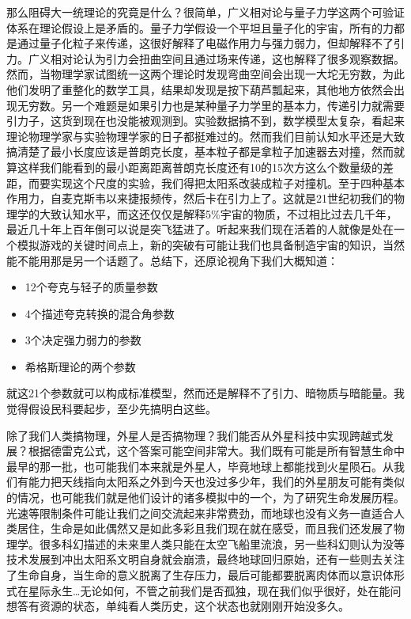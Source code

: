 \documentclass[]{book}
\providecommand{\tightlist}{%
  \setlength{\itemsep}{0pt}\setlength{\parskip}{0pt}}
\begin{document}
那么阻碍大一统理论的究竟是什么？很简单，广义相对论与量子力学这两个可验证体系在理论假设上是矛盾的。量子力学假设一个平坦且量子化的宇宙，所有的力都是通过量子化粒子来传递，这很好解释了电磁作用力与强力弱力，但却解释不了引力。广义相对论认为引力会扭曲空间且通过场来传递，这也解释了很多观察数据。然而，当物理学家试图统一这两个理论时发现弯曲空间会出现一大坨无穷数，为此他们发明了重整化的数学工具，结果却发现是按下葫芦瓢起来，其他地方依然会出现无穷数。另一个难题是如果引力也是某种量子力学里的基本力，传递引力就需要引力子，这货到现在也没能被观测到。实验数据搞不到，数学模型太复杂，看起来理论物理学家与实验物理学家的日子都挺难过的。然而我们目前认知水平还是大致搞清楚了最小长度应该是普朗克长度，基本粒子都是拿粒子加速器去对撞，然而就算这样我们能看到的最小距离距离普朗克长度还有10的15次方这么个数量级的差距，而要实现这个尺度的实验，我们得把太阳系改装成粒子对撞机。至于四种基本作用力，自麦克斯韦以来捷报频传，然后卡在引力上了。这就是21世纪初我们的物理学的大致认知水平，而这还仅仅是解释5\%宇宙的物质，不过相比过去几千年，最近几十年上百年倒可以说是突飞猛进了。听起来我们现在活着的人就像是处在一个模拟游戏的关键时间点上，新的突破有可能让我们也具备制造宇宙的知识，当然能不能用那是另一个话题了。总结下，还原论视角下我们大概知道：

\begin{itemize}
\tightlist
\item
  12个夸克与轻子的质量参数
\item
  4个描述夸克转换的混合角参数
\item
  3个决定强力弱力的参数
\item
  希格斯理论的两个参数
\end{itemize}

就这21个参数就可以构成标准模型，然而还是解释不了引力、暗物质与暗能量。我觉得假设民科要起步，至少先搞明白这些。

除了我们人类搞物理，外星人是否搞物理？我们能否从外星科技中实现跨越式发展？根据德雷克公式，这个答案可能空间非常大。我们既有可能是所有智慧生命中最早的那一批，也可能我们本来就是外星人，毕竟地球上都能找到火星陨石。从我们有能力把天线指向太阳系之外到今天也没过多少年，我们的外星朋友可能有类似的情况，也可能我们就是他们设计的诸多模拟中的一个，为了研究生命发展历程。光速等限制条件可能让我们之间交流起来非常费劲，而地球也没有义务一直适合人类居住，生命是如此偶然又是如此多彩且我们现在就在感受，而且我们还发展了物理学。很多科幻描述的未来里人类只能在太空飞船里流浪，另一些科幻则认为没等技术发展到冲出太阳系文明自身就会崩溃，最终地球回归原始，还有一些则去关注了生命自身，当生命的意义脱离了生存压力，最后可能都要脱离肉体而以意识体形式在星际永生\ldots{}无论如何，不管之前我们是否孤独，现在我们似乎很好，处在能问想答有资源的状态，单纯看人类历史，这个状态也就刚刚开始没多久。
\end{document}
